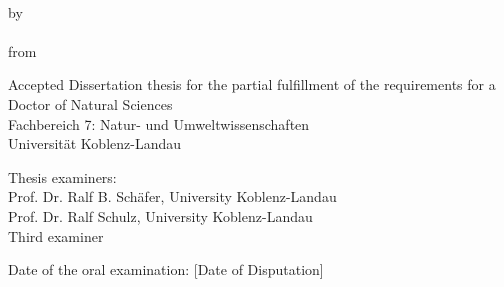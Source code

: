 \begin{titlepage}
    \begin{center}
        \large


        \begingroup
            \textbf{\LARGE\spacedallcaps{\myTitleOnTitlePageLineOne}}\\[0.5em]
            \spacedallcaps{\myTitleOnTitlePageLineTwo}
        \endgroup
        
        \vfill

        \begingroup
            by\\[1em]
            \Large \spacedlowsmallcaps{\myName} \\
            \small from \spacedlowsmallcaps{\myLocation}
        \endgroup

        \vfill

        \begingroup
            \small
            Accepted Dissertation thesis for the partial fulfillment of the requirements for a \\
            Doctor of Natural Sciences \\
            Fachbereich 7: Natur- und Umweltwissenschaften \\
            Universität Koblenz-Landau
        \endgroup

        \vfill

        \begingroup
            \small
            Thesis examiners: \\
            Prof. Dr. Ralf B. Schäfer, University Koblenz-Landau\\
            Prof. Dr. Ralf Schulz, University Koblenz-Landau\\
            Third examiner
        \endgroup

        \vfill

        \begingroup
            \small
            Date of the oral examination: [Date of Disputation]
        \endgroup
        
        \vfill                      

    \end{center}       
\end{titlepage}   
 
